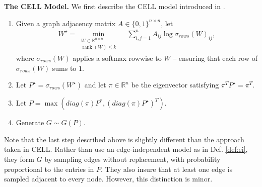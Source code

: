 \documentclass{article}
\newcommand{\todo}[1]{\textcolor{blue}{TODO: #1}}
\newcommand{\R}{\mathbb{R}}
\DeclareMathOperator{\rank}{rank}
\begin{document}


\noindent \textbf{The CELL Model.} We first describe the CELL model introduced in \cite{rendsburgnetgan}.
\begin{enumerate}
\item Given a graph adjacency matrix $A \in \{0,1\}^{n \times n}$, let
\begin{align}\label{eq:cell}
W^\star = \min_{\substack{W \in \R^{n \times n} \\\rank(W) \le k}}\quad \sum_{i,j=1}^n A_{ij} \log \sigma_{rows}(W)_{ij},
\end{align}
where $\sigma_{rows}(W)$ applies a softmax rowwise to $W$ -- ensuring that each row of $\sigma_{rows}(W)$ sums to $1$. 
\item Let $P^\star = \sigma_{rows}(W^\star)$ and let $\pi \in \R^n$ be the eigenvector satisfying $\pi^T P^\star = \pi^T$.
\item Let $P = \max(diag(\pi) P^*, (diag(\pi) P^\star)^T)$.
\item Generate $G \sim G(P)$.
\end{enumerate}
Note that the last step described above is slightly different than the approach taken in CELL. Rather than use an edge-independent model as in Def. \ref{def:ei}, they form $G$ by sampling edges without replacement, with probability proportional to the entries in $P$. They also insure that at least one edge is sampled adjacent to every node. However, this distinction is minor.
\end{document}
